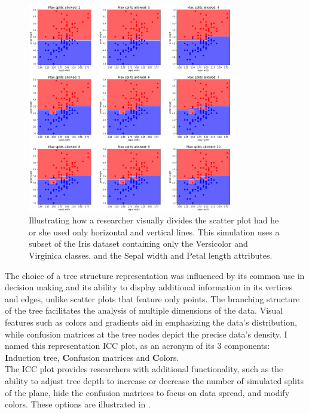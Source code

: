 \documentclass[11pt]{article}
\begin{document}
\begin{figure}[H]
\centering
\includegraphics[width=0.8\textwidth]{scatter_plot_illustration.png}

\caption{Illustrating how a researcher visually divides the scatter plot had he or she used only horizontal and vertical lines. This simulation uses a subset of the Iris dataset containing only the Versicolor and Virginica classes, and the Sepal width and Petal length attributes.}
\label{fig:fig1}

\end{figure}

The choice of a tree structure representation was influenced by its common use in decision making and its ability to display additional information in its vertices and edges, unlike scatter plots that feature only points. The branching structure of the tree facilitates the analysis of multiple dimensions of the data. Visual features such as colors and gradients aid in emphasizing the data's distribution, while confusion matrices at the tree nodes depict the precise data's density. I named this representation ICC plot, as an acronym of its 3 components: \textbf{I}nduction tree, \textbf{C}onfusion matrices and \textbf{C}olors. \\
The ICC plot provides researchers with additional functionality, such as the ability to adjust tree depth to increase or decrease the number of simulated splits of the plane, hide the confusion matrices to focus on data spread, and modify colors. These options are illustrated in .
\end{document}
